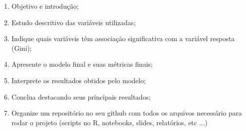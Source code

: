 \documentclass[thmsa,11pt]{article}
\begin{document}
\begin{enumerate}
	\item Objetivo e introdução;
	\item Estudo descritivo das variáveis utilizadas;
	\item Indique quais variáveis têm associação significativa com a variável resposta (Gini);
	\item Apresente o modelo final e suas métricas finais;
	\item Interprete os resultados obtidos pelo modelo;
	\item Conclua destacando seus principais resultados;
	\item Organize um repositório no seu github com todos os arquivos necessário para rodar o projeto (scripts no R, notebooks, slides, relatórios, etc ...)
\end{enumerate}
\end{document}

